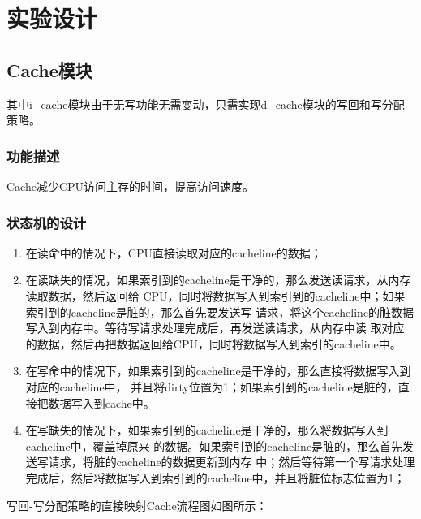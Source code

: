 \section{实验设计}
\subsection{Cache模块}\label{sub:Cache}
其中i\_cache模块由于无写功能无需变动，只需实现d\_cache模块的写回和写分配策略。
\subsubsection{功能描述}
Cache减少CPU访问主存的时间，提高访问速度。
\subsubsection{状态机的设计}
\begin{enumerate}
    \item 在读命中的情况下，CPU直接读取对应的cacheline的数据；
    \item 在读缺失的情况，如果索引到的cacheline是干净的，那么发送读请求，从内存读取数据，然后返回给
CPU，同时将数据写入到索引到的cacheline中；如果索引到的cacheline是脏的，那么首先要发送写
请求，将这个cacheline的脏数据写入到内存中。等待写请求处理完成后，再发送读请求，从内存中读
取对应的数据，然后再把数据返回给CPU，同时将数据写入到索引的cacheline中。
    \item 在写命中的情况下，如果索引到的cacheline是干净的，那么直接将数据写入到对应的cacheline中，
并且将dirty位置为1；如果索引到的cacheline是脏的，直接把数据写入到cache中。
    \item 在写缺失的情况下，如果索引到的cacheline是干净的，那么将数据写入到cacheline中，覆盖掉原来
的数据。如果索引到的cacheline是脏的，那么首先发送写请求，将脏的cacheline的数据更新到内存
中；然后等待第一个写请求处理完成后，然后将数据写入到索引到的cacheline中，并且将脏位标志位置为1；
\end{enumerate}
写回-写分配策略的直接映射Cache流程图如图所示：
